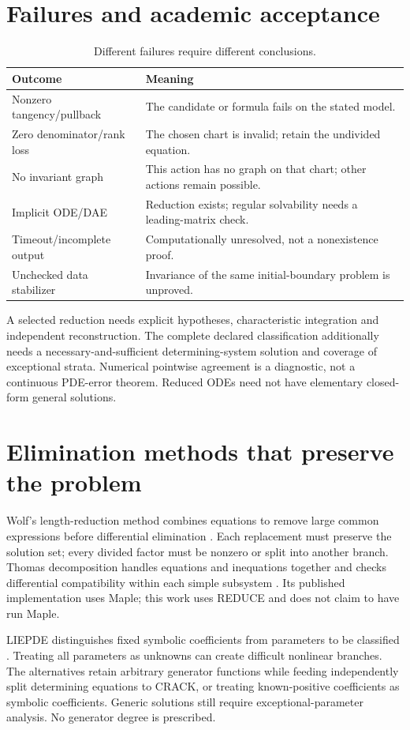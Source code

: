\documentclass[11pt,a4paper,oneside]{report}
\numberwithin{equation}{chapter}
\begin{document}
\section{Failures and academic acceptance}
\begin{table}[htbp]\centering\small
\begin{tabularx}{\textwidth}{@{}lX@{}}\toprule
Outcome & Meaning\\\midrule
Nonzero tangency/pullback & The candidate or formula fails on the stated model.\\
Zero denominator/rank loss & The chosen chart is invalid; retain the undivided equation.\\
No invariant graph & This action has no graph on that chart; other actions remain possible.\\
Implicit ODE/DAE & Reduction exists; regular solvability needs a leading-matrix check.\\
Timeout/incomplete output & Computationally unresolved, not a nonexistence proof.\\
Unchecked data stabilizer & Invariance of the same initial-boundary problem is unproved.\\\bottomrule
\end{tabularx}\caption{Different failures require different conclusions.}
\end{table}
A selected reduction needs explicit hypotheses, characteristic integration and independent reconstruction. The complete declared classification additionally needs a necessary-and-sufficient determining-system solution and coverage of exceptional strata. Numerical pointwise agreement is a diagnostic, not a continuous PDE-error theorem. Reduced ODEs need not have elementary closed-form general solutions.

\section{Elimination methods that preserve the problem}
Wolf's length-reduction method combines equations to remove large common expressions before differential elimination \cite{wolf2002}. Each replacement must preserve the solution set; every divided factor must be nonzero or split into another branch. Thomas decomposition handles equations and inequations together and checks differential compatibility within each simple subsystem \cite{thomas2010}. Its published implementation uses Maple; this work uses REDUCE and does not claim to have run Maple.

LIEPDE distinguishes fixed symbolic coefficients from parameters to be classified \cite{liepde}. Treating all parameters as unknowns can create difficult nonlinear branches. The alternatives retain arbitrary generator functions while feeding independently split determining equations to CRACK, or treating known-positive coefficients as symbolic coefficients. Generic solutions still require exceptional-parameter analysis. No generator degree is prescribed.
\end{document}
